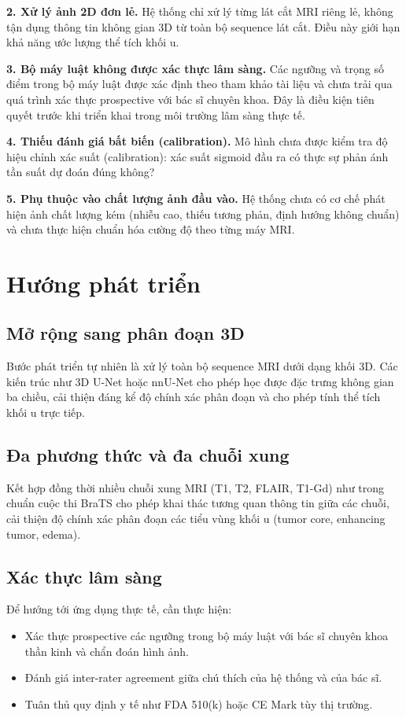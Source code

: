 \textbf{2. Xử lý ảnh 2D đơn lẻ.}
Hệ thống chỉ xử lý từng lát cắt MRI riêng lẻ, không tận dụng thông tin không gian 3D từ toàn bộ sequence lát cắt. Điều này giới hạn khả năng ước lượng thể tích khối u.

\textbf{3. Bộ máy luật không được xác thực lâm sàng.}
Các ngưỡng và trọng số điểm trong bộ máy luật được xác định theo tham khảo tài liệu và chưa trải qua quá trình xác thực prospective với bác sĩ chuyên khoa. Đây là điều kiện tiên quyết trước khi triển khai trong môi trường lâm sàng thực tế.

\textbf{4. Thiếu đánh giá bất biến (calibration).}
Mô hình chưa được kiểm tra độ hiệu chỉnh xác suất (calibration): xác suất sigmoid đầu ra có thực sự phản ánh tần suất dự đoán đúng không?

\textbf{5. Phụ thuộc vào chất lượng ảnh đầu vào.}
Hệ thống chưa có cơ chế phát hiện ảnh chất lượng kém (nhiễu cao, thiếu tương phản, định hướng không chuẩn) và chưa thực hiện chuẩn hóa cường độ theo từng máy MRI.

\section{Hướng phát triển}

\subsection{Mở rộng sang phân đoạn 3D}

Bước phát triển tự nhiên là xử lý toàn bộ sequence MRI dưới dạng khối 3D. Các kiến trúc như 3D U-Net hoặc nnU-Net cho phép học được đặc trưng không gian ba chiều, cải thiện đáng kể độ chính xác phân đoạn và cho phép tính thể tích khối u trực tiếp.

\subsection{Đa phương thức và đa chuỗi xung}

Kết hợp đồng thời nhiều chuỗi xung MRI (T1, T2, FLAIR, T1-Gd) như trong chuẩn cuộc thi BraTS \cite{Menze2015} cho phép khai thác tương quan thông tin giữa các chuỗi, cải thiện độ chính xác phân đoạn các tiểu vùng khối u (tumor core, enhancing tumor, edema).

\subsection{Xác thực lâm sàng}

Để hướng tới ứng dụng thực tế, cần thực hiện:
\begin{itemize}
    \item Xác thực prospective các ngưỡng trong bộ máy luật với bác sĩ chuyên khoa thần kinh và chẩn đoán hình ảnh.
    \item Đánh giá inter-rater agreement giữa chú thích của hệ thống và của bác sĩ.
    \item Tuân thủ quy định y tế như FDA 510(k) hoặc CE Mark tùy thị trường.
\end{itemize}

